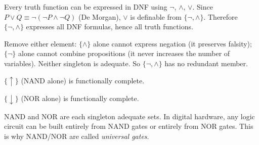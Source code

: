 \begin{remark}
Every truth function can be expressed in DNF using $\neg$, $\wedge$, $\vee$.
Since $P \vee Q \equiv \neg(\neg P \wedge \neg Q)$ (De Morgan), $\vee$ is
definable from $\{\neg, \wedge\}$. Therefore $\{\neg, \wedge\}$ expresses all
DNF formulas, hence all truth functions.
\end{remark}

\begin{remark}
Remove either element: $\{\wedge\}$ alone cannot express negation (it
preserves falsity); $\{\neg\}$ alone cannot combine propositions (it never
increases the number of variables). Neither singleton is adequate. So
$\{\neg, \wedge\}$ has no redundant member.
\end{remark}

\begin{tcolorbox}[colback=thmbox, colframe=thmborder, arc=2pt,
  left=6pt, right=6pt, top=4pt, bottom=4pt,
  title={\small\textbf{Theorem (NAND is Functionally Complete)}},
  fonttitle=\small\bfseries]
\label{thm:nand-adequate}
$\{\uparrow\}$ (NAND alone) is functionally complete.
\end{tcolorbox}



\begin{tcolorbox}[colback=thmbox, colframe=thmborder, arc=2pt,
  left=6pt, right=6pt, top=4pt, bottom=4pt,
  title={\small\textbf{Theorem (NOR is Functionally Complete)}},
  fonttitle=\small\bfseries]
\label{thm:nor-adequate}
$\{\downarrow\}$ (NOR alone) is functionally complete.
\end{tcolorbox}



\begin{remark}
NAND and NOR are each singleton adequate sets. In digital hardware, any
logic circuit can be built entirely from NAND gates or entirely from NOR
gates. This is why NAND/NOR are called \emph{universal gates}.
\end{remark}

